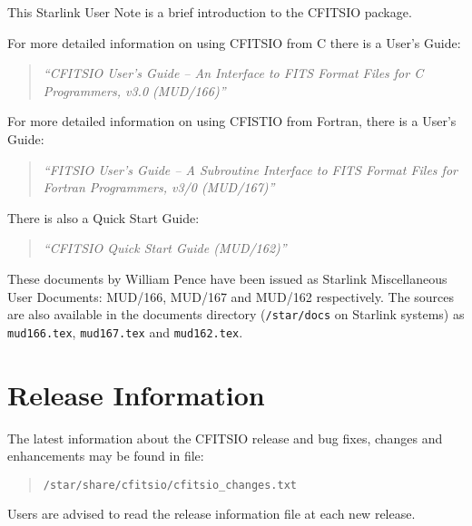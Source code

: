 \documentclass[twoside,11pt,nolof]{starlink}
\begin{document}
This Starlink User Note is a brief introduction to the CFITSIO package.

For more detailed information on using CFITSIO from C there is a User's 
Guide: 

\begin{quote}
\textit{``CFITSIO User's Guide -- An Interface to FITS Format Files for 
C Programmers, v3.0 (MUD/166)''}
\end{quote}

For more detailed information on using CFISTIO from Fortran, there is a 
User's Guide:

\begin{quote}
\textit{``FITSIO User's Guide -- A Subroutine Interface to FITS Format 
Files for Fortran Programmers, v3/0 (MUD/167)''}
\end{quote}

There is also a Quick Start Guide:

\begin{quote}
\textit{``CFITSIO Quick Start Guide (MUD/162)''}
\end{quote}

These documents by William Pence have been issued as Starlink
Miscellaneous User Documents:  MUD/166, MUD/167 and MUD/162 respectively.
The sources are also available in the documents directory
(\texttt{/star/docs} on Starlink systems) as \texttt{mud166.tex}, 
\texttt{mud167.tex} and \texttt{mud162.tex}.

\section{Release Information}
\label{release_information}

The latest information about the CFITSIO release and bug fixes, changes 
and enhancements may be found in file:

\begin{quote}
\texttt{/star/share/cfitsio/cfitsio\_changes.txt}
\end{quote}

Users are advised to read the release information file at each new
release.

\end{document}
